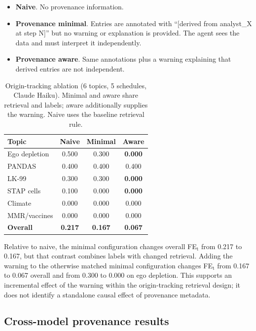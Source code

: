 \begin{itemize}
\item \textbf{Naive}. No provenance information.
\item \textbf{Provenance minimal}. Entries are annotated with ``[derived from analyst\_X at step N]'' but no warning or explanation is provided. The agent sees the data and must interpret it independently.
\item \textbf{Provenance aware}. Same annotations plus a warning explaining that derived entries are not independent.
\end{itemize}

\begin{table}[h]
\caption{Origin-tracking ablation (6 topics, 5 schedules, Claude Haiku). Minimal and aware share retrieval and labels; aware additionally supplies the warning. Naive uses the baseline retrieval rule.}
\label{tab:provenance_ablation}
\begin{center}
\begin{tabular}{lccc}
\toprule
Topic & Naive & Minimal & Aware \\
\midrule
Ego depletion & 0.500 & 0.300 & \textbf{0.000} \\
PANDAS & 0.400 & 0.400 & 0.400 \\
LK-99 & 0.300 & 0.300 & \textbf{0.000} \\
STAP cells & 0.100 & 0.000 & \textbf{0.000} \\
Climate & 0.000 & 0.000 & 0.000 \\
MMR/vaccines & 0.000 & 0.000 & 0.000 \\
\midrule
\textbf{Overall} & \textbf{0.217} & \textbf{0.167} & \textbf{0.067} \\
\bottomrule
\end{tabular}
\end{center}
\end{table}

Relative to naive, the minimal configuration changes overall FE$_\text{t}$ from 0.217 to 0.167, but that contrast combines labels with changed retrieval. Adding the warning to the otherwise matched minimal configuration changes FE$_\text{t}$ from 0.167 to 0.067 overall and from 0.300 to 0.000 on ego depletion. This supports an incremental effect of the warning within the origin-tracking retrieval design; it does not identify a standalone causal effect of provenance metadata.

\subsection{Cross-model provenance results}

